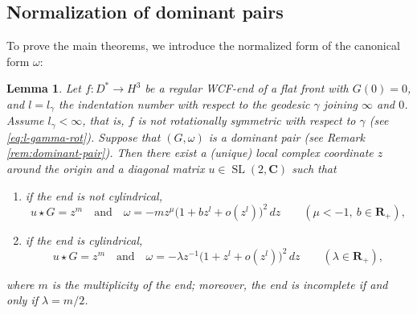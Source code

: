 \documentclass[a4paper]{amsart}
\theoremstyle{plain}
\newtheorem{lemma}[theorem]{Lemma}
\theoremstyle{remark}
\numberwithin{equation}{section}
\begin{document}
\subsection*{Normalization of dominant pairs}
To prove the main theorems, we introduce the 
normalized form of the canonical form $\omega$:
\begin{lemma}\label{lem:normalized-omega}
 Let $f\colon{}D^*\to H^3$ be a regular WCF-end of a flat front
 with $G(0)=0$,
 and $l=l_{\gamma}$ the indentation number with 
 respect to the geodesic $\gamma$ joining  $\infty$ and $0$.
 Assume $l_{\gamma}<\infty$, that is, $f$ is not rotationally symmetric
 with respect to $\gamma$ {\rm(}see \eqref{eq:l-gamma-rot}{\rm)}.
 Suppose that $(G,\omega)$ is a dominant pair
 {\rm (}see Remark \ref{rem:dominant-pair}{\rm)}.
 Then there exist a {\rm (}unique{\rm )} local complex coordinate $z$
 around the origin and a diagonal matrix $u\in {\operatorname{SL}}(2,{\boldsymbol{C}})$
 such that
\begingroup
 
 
 \begin{enumerate}
  \item\label{item:can-omega-non-cyl}
        if the end is not cylindrical, 
	\begin{equation}\label{eq:norm-omega-non-cyl}
	   u\star G=z^m\quad\text{and}\quad
	   \omega = -m z^\mu \bigl(1+bz^l+o(z^l)\bigr)^2\,dz\qquad
	   (\mu < -1,~b\in {\boldsymbol{R}}_+),
	\end{equation}
  \item\label{item:can-omega-cyl}
        if the end is cylindrical, 
	\begin{equation}\label{eq:norm-omega-cyl}
	    u\star G=z^m\quad\text{and}\quad
           \omega = -\lambda z^{-1} \bigl(1+z^l+o(z^l)\bigr)^2\,dz\qquad
	   (\lambda \in{\boldsymbol{R}}_+),
	\end{equation}
 \end{enumerate}
 \endgroup
\noindent
 where $m$ is the multiplicity of the end;
 moreover, the end is incomplete if and only if $\lambda={m}/{2}$.
\end{lemma}
\end{document}
